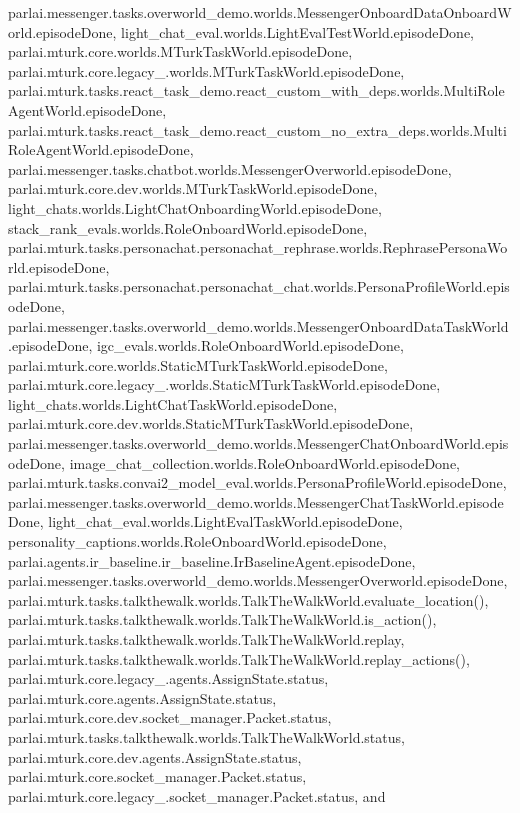 parlai.\+messenger.\+tasks.\+overworld\+\_\+demo.\+worlds.\+Messenger\+Onboard\+Data\+Onboard\+World.\+episode\+Done, light\+\_\+chat\+\_\+eval.\+worlds.\+Light\+Eval\+Test\+World.\+episode\+Done, parlai.\+mturk.\+core.\+worlds.\+M\+Turk\+Task\+World.\+episode\+Done, parlai.\+mturk.\+core.\+legacy\+\_.\+worlds.\+M\+Turk\+Task\+World.\+episode\+Done, parlai.\+mturk.\+tasks.\+react\+\_\+task\+\_\+demo.\+react\+\_\+custom\+\_\+with\+\_\+deps.\+worlds.\+Multi\+Role\+Agent\+World.\+episode\+Done, parlai.\+mturk.\+tasks.\+react\+\_\+task\+\_\+demo.\+react\+\_\+custom\+\_\+no\+\_\+extra\+\_\+deps.\+worlds.\+Multi\+Role\+Agent\+World.\+episode\+Done, parlai.\+messenger.\+tasks.\+chatbot.\+worlds.\+Messenger\+Overworld.\+episode\+Done, parlai.\+mturk.\+core.\+dev.\+worlds.\+M\+Turk\+Task\+World.\+episode\+Done, light\+\_\+chats.\+worlds.\+Light\+Chat\+Onboarding\+World.\+episode\+Done, stack\+\_\+rank\+\_\+evals.\+worlds.\+Role\+Onboard\+World.\+episode\+Done, parlai.\+mturk.\+tasks.\+personachat.\+personachat\+\_\+rephrase.\+worlds.\+Rephrase\+Persona\+World.\+episode\+Done, parlai.\+mturk.\+tasks.\+personachat.\+personachat\+\_\+chat.\+worlds.\+Persona\+Profile\+World.\+episode\+Done, parlai.\+messenger.\+tasks.\+overworld\+\_\+demo.\+worlds.\+Messenger\+Onboard\+Data\+Task\+World.\+episode\+Done, igc\+\_\+evals.\+worlds.\+Role\+Onboard\+World.\+episode\+Done, parlai.\+mturk.\+core.\+worlds.\+Static\+M\+Turk\+Task\+World.\+episode\+Done, parlai.\+mturk.\+core.\+legacy\+\_.\+worlds.\+Static\+M\+Turk\+Task\+World.\+episode\+Done, light\+\_\+chats.\+worlds.\+Light\+Chat\+Task\+World.\+episode\+Done, parlai.\+mturk.\+core.\+dev.\+worlds.\+Static\+M\+Turk\+Task\+World.\+episode\+Done, parlai.\+messenger.\+tasks.\+overworld\+\_\+demo.\+worlds.\+Messenger\+Chat\+Onboard\+World.\+episode\+Done, image\+\_\+chat\+\_\+collection.\+worlds.\+Role\+Onboard\+World.\+episode\+Done, parlai.\+mturk.\+tasks.\+convai2\+\_\+model\+\_\+eval.\+worlds.\+Persona\+Profile\+World.\+episode\+Done, parlai.\+messenger.\+tasks.\+overworld\+\_\+demo.\+worlds.\+Messenger\+Chat\+Task\+World.\+episode\+Done, light\+\_\+chat\+\_\+eval.\+worlds.\+Light\+Eval\+Task\+World.\+episode\+Done, personality\+\_\+captions.\+worlds.\+Role\+Onboard\+World.\+episode\+Done, parlai.\+agents.\+ir\+\_\+baseline.\+ir\+\_\+baseline.\+Ir\+Baseline\+Agent.\+episode\+Done, parlai.\+messenger.\+tasks.\+overworld\+\_\+demo.\+worlds.\+Messenger\+Overworld.\+episode\+Done, parlai.\+mturk.\+tasks.\+talkthewalk.\+worlds.\+Talk\+The\+Walk\+World.\+evaluate\+\_\+location(), parlai.\+mturk.\+tasks.\+talkthewalk.\+worlds.\+Talk\+The\+Walk\+World.\+is\+\_\+action(), parlai.\+mturk.\+tasks.\+talkthewalk.\+worlds.\+Talk\+The\+Walk\+World.\+replay, parlai.\+mturk.\+tasks.\+talkthewalk.\+worlds.\+Talk\+The\+Walk\+World.\+replay\+\_\+actions(), parlai.\+mturk.\+core.\+legacy\+\_.\+agents.\+Assign\+State.\+status, parlai.\+mturk.\+core.\+agents.\+Assign\+State.\+status, parlai.\+mturk.\+core.\+dev.\+socket\+\_\+manager.\+Packet.\+status, parlai.\+mturk.\+tasks.\+talkthewalk.\+worlds.\+Talk\+The\+Walk\+World.\+status, parlai.\+mturk.\+core.\+dev.\+agents.\+Assign\+State.\+status, parlai.\+mturk.\+core.\+socket\+\_\+manager.\+Packet.\+status, parlai.\+mturk.\+core.\+legacy\+\_.\+socket\+\_\+manager.\+Packet.\+status, and 